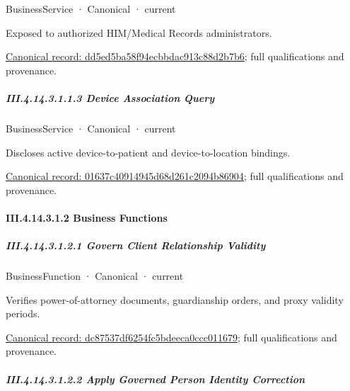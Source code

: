 \label{element:dd5ed5ba58f94ecbbdac913c88d2b7b6}
{\small BusinessService · Canonical · current}\par

Exposed to authorized HIM/Medical Records administrators.


{\footnotesize \href{../../../../../../../continuum/business/business-service/dd5ed5ba58f94ecbbdac913c88d2b7b6.md}{Canonical record: dd5ed5ba58f94ecbbdac913c88d2b7b6}; full qualifications and provenance.}\par
\subparagraph*{III.4.14.3.1.1.3 Device Association Query}
\label{navigation:III.4.14.3.1.1.3}

\label{element:01637c40914945d68d261c2094b86904}
{\small BusinessService · Canonical · current}\par

Discloses active device-to-patient and device-to-location bindings.


{\footnotesize \href{../../../../../../../continuum/business/business-service/01637c40914945d68d261c2094b86904.md}{Canonical record: 01637c40914945d68d261c2094b86904}; full qualifications and provenance.}\par
\paragraph*{III.4.14.3.1.2 Business Functions}
\label{navigation:III.4.14.3.1.2}

\subparagraph*{III.4.14.3.1.2.1 Govern Client Relationship Validity}
\label{navigation:III.4.14.3.1.2.1}

\label{element:dc87537df6254fc5bdeeca0ccc011679}
{\small BusinessFunction · Canonical · current}\par

Verifies power-of-attorney documents, guardianship orders, and proxy validity periods.


{\footnotesize \href{../../../../../../../continuum/business/business-function/dc87537df6254fc5bdeeca0ccc011679.md}{Canonical record: dc87537df6254fc5bdeeca0ccc011679}; full qualifications and provenance.}\par
\subparagraph*{III.4.14.3.1.2.2 Apply Governed Person Identity Correction}
\label{navigation:III.4.14.3.1.2.2}

